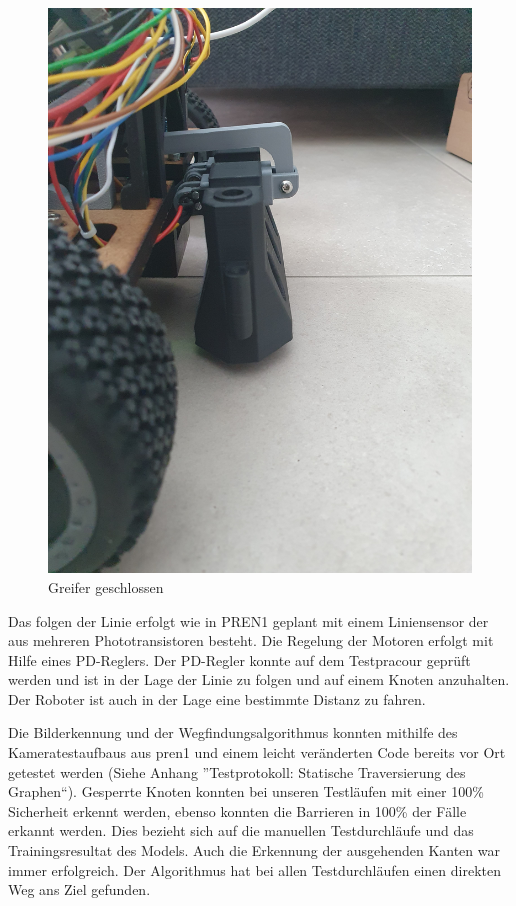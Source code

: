 \begin{figure}[H]
\begin{minipage}[b]{0.49\textwidth}
  \includegraphics[width=\textwidth, angle=-90]{assets/MT/greifer-close.jpg}
  \caption{Greifer geschlossen}
  \label{fig:griefe-rclose}
\end{minipage}
\end{figure}



Das folgen der Linie erfolgt wie in PREN1 geplant mit einem Liniensensor der aus mehreren Phototransistoren besteht. Die Regelung der Motoren erfolgt mit Hilfe eines PD-Reglers. Der PD-Regler konnte auf dem Testpracour geprüft werden und ist in der Lage der Linie zu folgen und auf einem Knoten anzuhalten. Der Roboter ist auch in der Lage eine bestimmte Distanz zu fahren.

Die Bilderkennung und der Wegfindungsalgorithmus  konnten mithilfe des Kameratestaufbaus aus \acrshort{pren1} und einem leicht veränderten Code bereits vor Ort getestet werden (Siehe Anhang ''Testprotokoll: Statische Traversierung des Graphen``). Gesperrte Knoten konnten bei unseren Testläufen mit einer 100\% Sicherheit erkennt werden, ebenso konnten die Barrieren in 100\% der Fälle erkannt werden. Dies bezieht sich auf die manuellen Testdurchläufe und das Trainingsresultat des Models. Auch die Erkennung der ausgehenden Kanten war immer erfolgreich. Der Algorithmus hat bei allen Testdurchläufen einen direkten Weg ans Ziel gefunden. 

